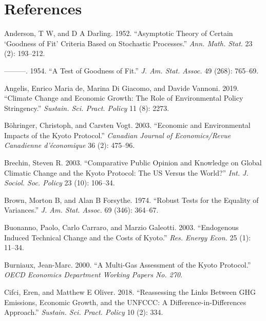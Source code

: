 \documentclass[
  letterpaper,
  DIV=11,
  numbers=noendperiod]{scrartcl}
\newlength{\cslhangindent}
\newlength{\cslentryspacingunit} %
\newenvironment{CSLReferences}[2] %
 {%
  \setlength{\parindent}{0pt}
  \ifodd #1
  \let\oldpar\par
  \def\par{\hangindent=\cslhangindent\oldpar}
  \fi
  \setlength{\parskip}{#2\cslentryspacingunit}
 }%
 {}
\begin{document}
\hypertarget{references}{%
\section*{References}\label{references}}

\hypertarget{refs}{}
\begin{CSLReferences}{1}{0}
\leavevmode{}%
Anderson, T W, and D A Darling. 1952. {``Asymptotic Theory of Certain
{`Goodness of Fit'} Criteria Based on Stochastic Processes.''}
\emph{Ann. Math. Stat.} 23 (2): 193--212.

\leavevmode{}%
---------. 1954. {``A Test of Goodness of Fit.''} \emph{J. Am. Stat.
Assoc.} 49 (268): 765--69.

\leavevmode{}%
Angelis, Enrico Maria de, Marina Di Giacomo, and Davide Vannoni. 2019.
{``Climate Change and Economic Growth: The Role of Environmental Policy
Stringency.''} \emph{Sustain. Sci. Pract. Policy} 11 (8): 2273.

\leavevmode{}%
Böhringer, Christoph, and Carsten Vogt. 2003. {``Economic and
Environmental Impacts of the Kyoto Protocol.''} \emph{Canadian Journal
of Economics/Revue Canadienne d'{é}conomique} 36 (2): 475--96.

\leavevmode{}%
Brechin, Steven R. 2003. {``Comparative Public Opinion and Knowledge on
Global Climatic Change and the Kyoto Protocol: The {US} Versus the
World?''} \emph{Int. J. Sociol. Soc. Policy} 23 (10): 106--34.

\leavevmode{}%
Brown, Morton B, and Alan B Forsythe. 1974. {``Robust Tests for the
Equality of Variances.''} \emph{J. Am. Stat. Assoc.} 69 (346): 364--67.

\leavevmode{}%
Buonanno, Paolo, Carlo Carraro, and Marzio Galeotti. 2003. {``Endogenous
Induced Technical Change and the Costs of Kyoto.''} \emph{Res. Energy
Econ.} 25 (1): 11--34.

\leavevmode{}%
Burniaux, Jean-Marc. 2000. {``A Multi-Gas Assessment of the Kyoto
Protocol.''} \emph{OECD Economics Department Working Papers No. 270}.

\leavevmode{}%
Cifci, Eren, and Matthew E Oliver. 2018. {``Reassessing the Links
Between {GHG} Emissions, Economic Growth, and the {UNFCCC}: A
{Difference-in-Differences} Approach.''} \emph{Sustain. Sci. Pract.
Policy} 10 (2): 334.


\end{CSLReferences}
\end{document}
